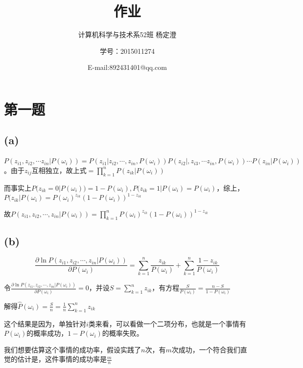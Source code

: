 \documentclass{ctexart}
\begin{document}
\title{作业}
\author{计算机科学与技术系52班 杨定澄 \and 学号：2015011274 \and E-mail:892431401@qq.com}
\date{}
\maketitle
\section*{第一题}
\subsection*{(a)}
$P(z_{i1},z_{i2},\cdots z_{in}|P(\omega_i))=P(z_{i1}|z_{i2},\cdots,z_{in},P(\omega_i))P(z_{i2}|,z_{i3},\cdots z_{in},P(\omega_i))\cdots P(z_{in}|P(\omega_i))$。由于$z_{ij}$互相独立，故$\textrm{上式}=\prod\limits_{k=1}^nP(z_{ik}|P(\omega_i))$

而事实上$P(z_{ik}=0|P(\omega_i))=1-P(\omega_i),P(z_{ik}=1|P(\omega_i)=P(\omega_i)$，综上，$P(z_{ik}|P(\omega_i)=P(\omega_i)^{z_{ik}}(1-P(\omega_i))^{1-z_{ik}}$

故$P(z_{i1},z_{i2},\cdots,z_{in}|P(\omega_i))=\prod\limits_{k=1}^nP(\omega_i)^{z_{ik}}(1-P(\omega_i))^{1-z_{ik}}$
\subsection*{(b)}
\[\frac{\partial \ln P(z_{i1},z_{i2},\cdots,z_{in}|P(\omega_i))}{\partial P(\omega_i)}=\sum_{k=1}^n \frac{z_{ik}}{P(\omega_i)}+\sum_{k=1}^n \frac{1-z_{ik}}{P(\omega_i)}\]

令$\frac{\partial \ln P(z_{i1},z_{i2},\cdots,z_{in}|P(\omega_i))}{\partial P(\omega_i)}=0$，并设$S=\sum\limits_{k=1}^n z_{ik}$，有方程$\frac{S}{P(\omega_i)}=\frac{n-S}{1-P(\omega_i)}$

解得$\hat{P}(\omega_i)=\frac{S}{n}=\frac{1}{n}\sum\limits_{k=1}^n z_{ik}$

这个结果是因为，单独针对$i$类来看，可以看做一个二项分布，也就是一个事情有$P(\omega_i)$的概率成功，$1-P(\omega_i)$的概率失败。

我们想要估算这个事情的成功率，假设实践了$n$次，有$m$次成功，一个符合我们直觉的估计是，这件事情的成功率是$\frac{m}{n}$
\end{document}

